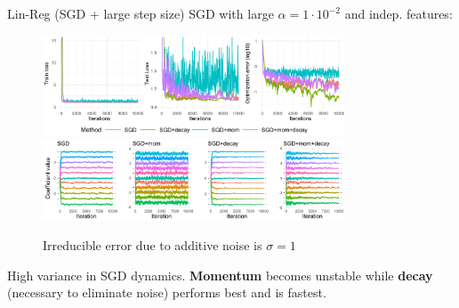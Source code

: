 \documentclass[11pt,compress,t,notes=noshow, xcolor=table]{beamer}
\begin{document}
\begin{vbframe}{Lin-Reg (SGD + large step size)}
\vspace{-0.4cm}
SGD with large $\alpha=1 \cdot 10^{-2}$ and indep. features:
\begin{figure}
            \includegraphics[width=0.8\textwidth]{figure_man/simu_linmod/SGD_reg_large_lr_iters.pdf} \\
             \includegraphics[width=0.8\textwidth]{figure_man/simu_linmod/SGD_reg_coef_large.pdf}\\
            \begin{footnotesize}
                Irreducible error due to additive noise is $\sigma=1$
            \end{footnotesize}
\end{figure}
High variance in SGD dynamics. \textbf{Momentum} becomes unstable while \textbf{decay} (necessary to eliminate noise) performs best and is fastest.
\end{vbframe}
\end{document}

